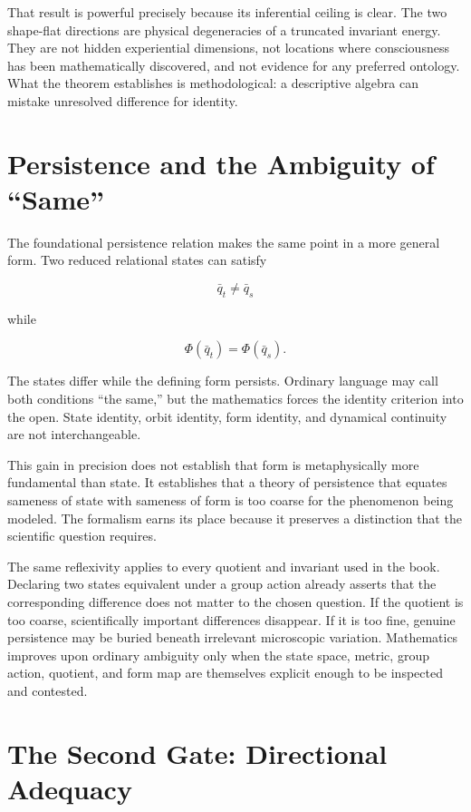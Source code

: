 That result is powerful precisely because its inferential ceiling is clear. The two shape-flat directions are physical degeneracies of a truncated invariant energy. They are not hidden experiential dimensions, not locations where consciousness has been mathematically discovered, and not evidence for any preferred ontology. What the theorem establishes is methodological: a descriptive algebra can mistake unresolved difference for identity.

\section{Persistence and the Ambiguity of ``Same''}

The foundational persistence relation makes the same point in a more general form. Two reduced relational states can satisfy

\[
\bar q_t\neq\bar q_s
\]

while

\[
\Phi(\bar q_t)=\Phi(\bar q_s).
\]

The states differ while the defining form persists. Ordinary language may call both conditions ``the same,'' but the mathematics forces the identity criterion into the open. State identity, orbit identity, form identity, and dynamical continuity are not interchangeable.

This gain in precision does not establish that form is metaphysically more fundamental than state. It establishes that a theory of persistence that equates sameness of state with sameness of form is too coarse for the phenomenon being modeled. The formalism earns its place because it preserves a distinction that the scientific question requires.

The same reflexivity applies to every quotient and invariant used in the book. Declaring two states equivalent under a group action already asserts that the corresponding difference does not matter to the chosen question. If the quotient is too coarse, scientifically important differences disappear. If it is too fine, genuine persistence may be buried beneath irrelevant microscopic variation. Mathematics improves upon ordinary ambiguity only when the state space, metric, group action, quotient, and form map are themselves explicit enough to be inspected and contested.

\section{The Second Gate: Directional Adequacy}

